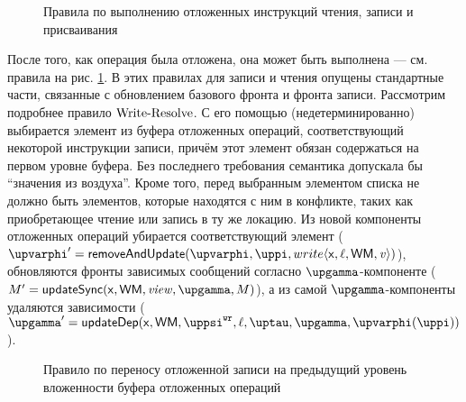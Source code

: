\begin{figure}
\begin{mathpar}
\end{mathpar}
\caption{Правила по выполнению отложенных инструкций чтения, записи и присваивания}
\label{fig:resolve-sem}
\end{figure}

После того, как операция была отложена, она может быть выполнена --- см. правила на рис. \ref{fig:resolve-sem}.
В этих правилах для записи и чтения опущены стандартные части, связанные с обновлением базового фронта и фронта записи.
Рассмотрим подробнее правило ${\rm Write\text{-}Resolve}$.
С его помощью (недетерминированно) выбирается элемент из буфера отложенных операций, соответствующий некоторой инструкции
записи, причём этот элемент обязан содержаться на первом уровне буфера. Без последнего требования семантика допускала бы 
``значения из воздуха''.
Кроме того, перед выбранным элементом списка не должно быть элементов, которые находятся с ним в конфликте,
таких как приобретающее чтение или запись в ту же локацию.
Из новой компоненты отложенных операций убирается соответствующий элемент
($\stPhi' = \remove(\stPhi, \stpath, write\angled{\vName, \loc, \WM, \mvalSubst})$),
обновляются фронты зависимых сообщений согласно $\stGamma$-компоненте
($\stEta' = \updateSync(\vName, \WM, \stSigma, \stGamma, \stEta)$),
а из самой $\stGamma$-компоненты удаляются зависимости
($\stGamma' = \updateDep(\vName, \WM, \stPsiWrite, \loc, \stTau, \stGamma, \stPhi(\stpath))$).

\begin{figure}
\begin{mathpar}
\end{mathpar}
\caption{Правило по переносу отложенной записи на предыдущий уровень вложенности буфера отложенных операций}
\label{fig:promote-sem}
\end{figure}

